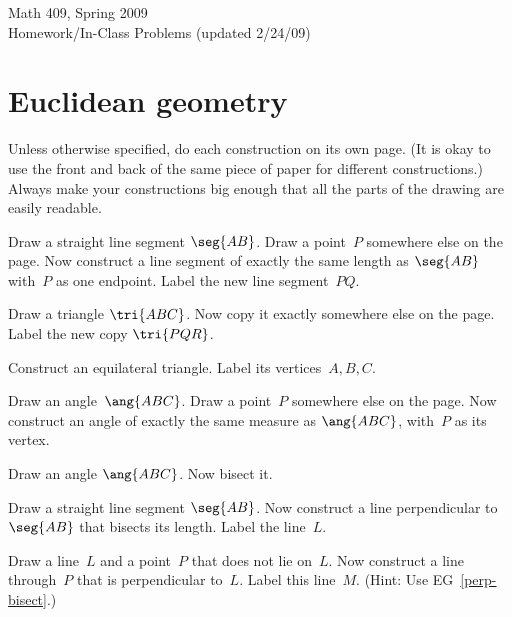 


\begin{center}\large Math 409, Spring 2009\\
Homework/In-Class Problems
(updated 2/24/09)
\end{center}

\section{Euclidean geometry}

Unless otherwise specified, do each construction on its own page.
(It is okay to use the front and back of the same piece of paper for different constructions.)
Always make your constructions big enough that all the parts of the drawing are easily readable.

\begin{EG}
Draw a straight line segment $\seg{AB}$.  Draw a point~$P$ somewhere else 
on the page.  Now construct a line segment of exactly the same length as $\seg{AB}$ 
with~$P$ as one endpoint.  Label the new line segment~$PQ$.
\end{EG}

\begin{EG}
Draw a triangle $\tri{ABC}$.  Now copy it exactly somewhere else on the 
page.  Label the new copy $\tri{PQR}$.
\end{EG}

\begin{EG}
Construct an equilateral triangle.  Label its vertices~$A,B,C$.
\end{EG}

\begin{EG}
Draw an angle~$\ang{ABC}$.  Draw a point~$P$ somewhere else on the page.
Now construct an angle of exactly the same measure as $\ang{ABC}$, with~$P$ as
its vertex.
\end{EG}

\begin{EG}
Draw an angle $\ang{ABC}$.  Now bisect it.
\end{EG}

\begin{EG}\label{perp-bisect}
Draw a straight line segment $\seg{AB}$.  Now construct a line
perpendicular to $\seg{AB}$ that bisects its length.  Label the line~$L$.
\end{EG}

\begin{EG}\label{perp-line}
Draw a line~$L$ and a point~$P$ that does not lie on~$L$.
Now construct a line through~$P$ that is perpendicular to~$L$.
Label this line~$M$.  (Hint: Use EG~\ref{perp-bisect}.)
\end{EG}

